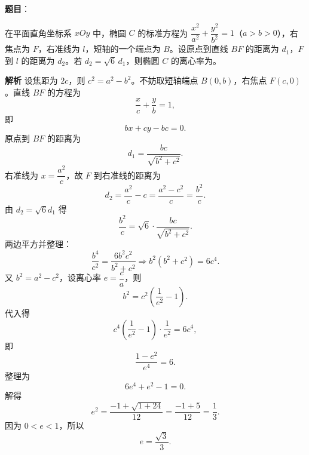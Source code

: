 \begin{answer}

\textbf{题目}：

在平面直角坐标系 $xOy$ 中，椭圆 $C$ 的标准方程为 $\dfrac{x^2}{a^2}+\dfrac{y^2}{b^2}=1$（$a>b>0$），右焦点为 $F$，右准线为 $l$，短轴的一个端点为 $B$。设原点到直线 $BF$ 的距离为 $d_1$，$F$ 到 $l$ 的距离为 $d_2$。若 $d_2=\sqrt6\,d_1$，则椭圆 $C$ 的离心率为\gkblank{}。

\textbf{解析}
设焦距为 $2c$，则 $c^2=a^2-b^2$。不妨取短轴端点 $B(0,b)$，右焦点 $F(c,0)$。直线 $BF$ 的方程为
\nopagebreak[4]
\[\frac xc+\frac yb=1,\]
即
\nopagebreak[4]
\[bx+cy-bc=0.\]
原点到 $BF$ 的距离为
\nopagebreak[4]
\[d_1=\frac{bc}{\sqrt{b^2+c^2}}.\]
右准线为 $x=\dfrac{a^2}{c}$，故 $F$ 到右准线的距离为
\nopagebreak[4]
\[d_2=\frac{a^2}{c}-c=\frac{a^2-c^2}{c}=\frac{b^2}{c}.\]
由 $d_2=\sqrt6d_1$ 得
\nopagebreak[4]
\[\frac{b^2}{c}=\sqrt6\cdot\frac{bc}{\sqrt{b^2+c^2}}.\]
两边平方并整理：
\nopagebreak[4]
\[\frac{b^4}{c^2}=\frac{6b^2c^2}{b^2+c^2}
\Longrightarrow b^2(b^2+c^2)=6c^4.\]
又 $b^2=a^2-c^2$，设离心率 $e=\dfrac ca$，则
\nopagebreak[4]
\[b^2=c^2\left(\frac1{e^2}-1\right).\]
代入得
\nopagebreak[4]
\[c^4\left(\frac1{e^2}-1\right)\cdot\frac1{e^2}=6c^4,\]
即
\nopagebreak[4]
\[\frac{1-e^2}{e^4}=6.\]
整理为
\nopagebreak[4]
\[6e^4+e^2-1=0.\]
解得
\nopagebreak[4]
\[e^2=\frac{-1+\sqrt{1+24}}{12}=\frac{-1+5}{12}=\frac13.\]
因为 $0<e<1$，所以
\nopagebreak[4]
\[e=\frac{\sqrt3}{3}.\]


\end{answer}
